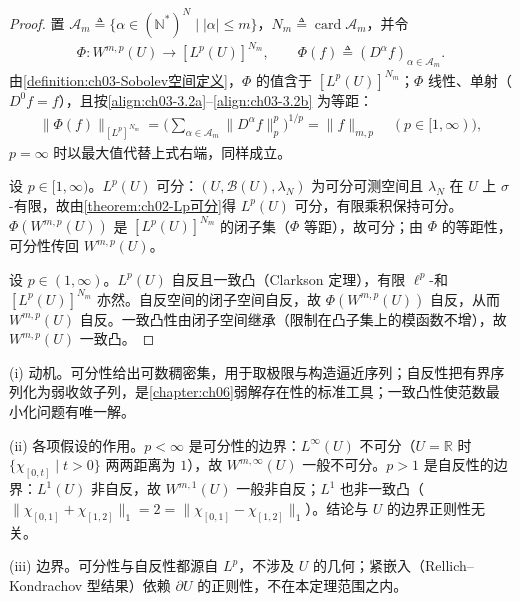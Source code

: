 \documentclass[../../main.tex]{subfiles}%
\begin{document}
\begin{proof}
置 $\mathcal{A}_m\triangleq\{\alpha\in(\mathbb{N}^*)^N\mid|\alpha|\leqslant m\}$，$N_m\triangleq\operatorname{card}\mathcal{A}_m$，并令
\begin{align*}
\Phi:W^{m,p}(U)\to[L^p(U)]^{N_m},\qquad \Phi(f)\triangleq(D^\alpha f)_{\alpha\in\mathcal{A}_m}.
\end{align*}
由\cref{definition:ch03-Sobolev空间定义}，$\Phi$ 的值含于 $[L^p(U)]^{N_m}$；$\Phi$ 线性、单射（$D^0f=f$），且按\eqref{align:ch03-3.2a}--\eqref{align:ch03-3.2b} 为等距：
\begin{align*}
\|\Phi(f)\|_{[L^p]^{N_m}}=\Big(\sum_{\alpha\in\mathcal{A}_m}\|D^\alpha f\|_p^p\Big)^{1/p}=\|f\|_{m,p}\quad(p\in[1,\infty)),
\end{align*}
$p=\infty$ 时以最大值代替上式右端，同样成立。

设 $p\in[1,\infty)$。$L^p(U)$ 可分：$(U,\mathcal{B}(U),\lambda_N)$ 为可分可测空间且 $\lambda_N$ 在 $U$ 上 $\sigma$-有限，故由\cref{theorem:ch02-Lp可分}得 $L^p(U)$ 可分，有限乘积保持可分。$\Phi(W^{m,p}(U))$ 是 $[L^p(U)]^{N_m}$ 的闭子集（$\Phi$ 等距），故可分；由 $\Phi$ 的等距性，可分性传回 $W^{m,p}(U)$。

设 $p\in(1,\infty)$。$L^p(U)$ 自反且一致凸（Clarkson 定理），有限 $\ell^p$-和 $[L^p(U)]^{N_m}$ 亦然。自反空间的闭子空间自反，故 $\Phi(W^{m,p}(U))$ 自反，从而 $W^{m,p}(U)$ 自反。一致凸性由闭子空间继承（限制在凸子集上的模函数不增），故 $W^{m,p}(U)$ 一致凸。
\end{proof}

\begin{remark}\label{remark:ch03-Sobolev可分动机}
(i) 动机。可分性给出可数稠密集，用于取极限与构造逼近序列；自反性把有界序列化为弱收敛子列，是\cref{chapter:ch06}弱解存在性的标准工具；一致凸性使范数最小化问题有唯一解。

(ii) 各项假设的作用。$p<\infty$ 是可分性的边界：$L^\infty(U)$ 不可分（$U=\mathbb{R}$ 时 $\{\chi_{[0,t]}\mid t>0\}$ 两两距离为 $1$），故 $W^{m,\infty}(U)$ 一般不可分。$p>1$ 是自反性的边界：$L^1(U)$ 非自反，故 $W^{m,1}(U)$ 一般非自反；$L^1$ 也非一致凸（$\|\chi_{[0,1]}+\chi_{[1,2]}\|_1=2=\|\chi_{[0,1]}-\chi_{[1,2]}\|_1$）。结论与 $U$ 的边界正则性无关。

(iii) 边界。可分性与自反性都源自 $L^p$，不涉及 $U$ 的几何；紧嵌入（Rellich--Kondrachov 型结果）依赖 $\partial U$ 的正则性，不在本定理范围之内。
\end{remark}
\end{document}

